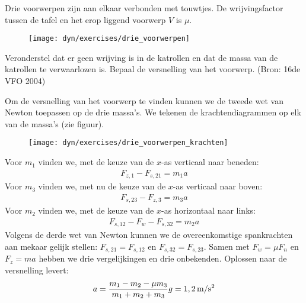 
\begin{exercise}




 Drie voorwerpen zijn aan elkaar verbonden met touwtjes. De wrij\-vings\-factor tussen de tafel en het erop liggend voorwerp $V$ is $\mu$.
\begin{figure}[h]
\begin{center}
\texttt{[image: dyn/exercises/drie\_voorwerpen]}
\end{center}
\end{figure}
Veronderstel dat er geen wrijving is in de katrollen en dat de massa van de katrollen te verwaarlozen is. Bepaal de versnelling van het voorwerp. (Bron: 16de VFO 2004)
\begin{oplossing}
\newline
Om de versnelling van het voorwerp te vinden kunnen we de tweede wet van Newton toepassen op de drie massa's. We tekenen de krachtendiagrammen op elk van de massa's (zie figuur). 
\begin{figure}[h]
\begin{center}
\texttt{[image: dyn/exercises/drie\_voorwerpen\_krachten]}
\end{center}
\end{figure}

Voor $m_1$ vinden we, met de keuze van de $x$-as verticaal naar beneden:
\begin{eqnarray}
F_{z,1}-F_{s,21}=m_1a\label{m_1}
\end{eqnarray}
Voor $m_3$ vinden we, met nu de keuze van de $x$-as verticaal naar boven:
\begin{eqnarray}
F_{s,23}-F_{z,3}=m_3a\label{m_3}
\end{eqnarray}
Voor $m_2$ vinden we, met de keuze van de $x$-as horizontaal naar links:
\begin{eqnarray}
F_{s,12}-F_w-F_{s,32}=m_2a\label{m_2}
\end{eqnarray}
Volgens de derde wet van Newton kunnen we de overeenkomstige spankrachten aan mekaar gelijk stellen: $F_{s,21}=F_{s,12}$ en $F_{s,32}=F_{s,23}$. Samen met $F_w=\mu F_n$ en $F_z=ma$ hebben we drie vergelijkingen en drie onbekenden. Oplossen naar de versnelling levert:
\begin{eqnarray*}
a=\frac{m_1-m_2-\mu m_3}{m_1+m_2+m_3}g=1,2\rm\,m/s^2
\end{eqnarray*}



\end{oplossing}
\end{exercise}
